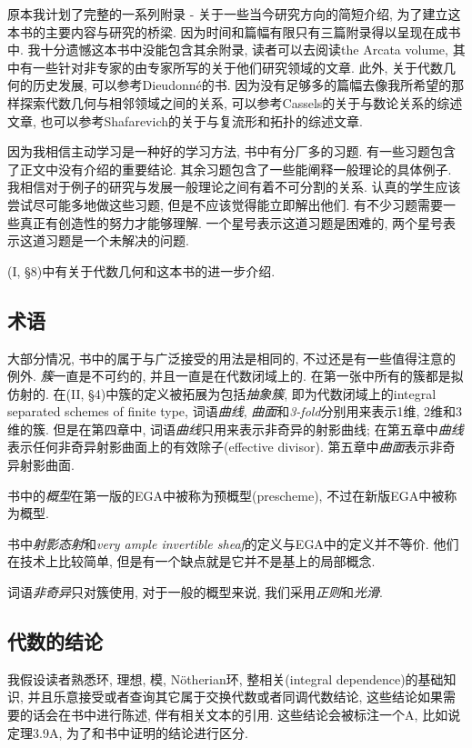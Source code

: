 原本我计划了完整的一系列附录 - 关于一些当今研究方向的简短介绍, 为了建立这本书的主要内容与研究的桥梁. 因为时间和篇幅有限只有三篇附录得以呈现在成书中. 我十分遗憾这本书中没能包含其余附录, 读者可以去阅读the Arcata volume, 其中有一些针对非专家的由专家所写的关于他们研究领域的文章. 此外, 关于代数几何的历史发展, 可以参考Dieudonn\'e的书. 因为没有足够多的篇幅去像我所希望的那样探索代数几何与相邻领域之间的关系, 可以参考Cassels的关于与数论关系的综述文章, 也可以参考Shafarevich的关于与复流形和拓扑的综述文章.

因为我相信主动学习是一种好的学习方法, 书中有分厂多的习题. 有一些习题包含了正文中没有介绍的重要结论. 其余习题包含了一些能阐释一般理论的具体例子. 我相信对于例子的研究与发展一般理论之间有着不可分割的关系. 认真的学生应该尝试尽可能多地做这些习题, 但是不应该觉得能立即解出他们. 有不少习题需要一些真正有创造性的努力才能够理解. 一个星号表示这道习题是困难的, 两个星号表示这道习题是一个未解决的问题.

(I, \S 8)中有关于代数几何和这本书的进一步介绍.

\subsection*{术语}

大部分情况, 书中的属于与广泛接受的用法是相同的, 不过还是有一些值得注意的例外. \emph{簇}一直是不可约的, 并且一直是在代数闭域上的. 在第一张中所有的簇都是拟仿射的. 在(II, \S 4)中簇的定义被拓展为包括\emph{抽象簇}, 即为代数闭域上的integral separated schemes of finite type, 词语\emph{曲线}, \emph{曲面}和\emph{3-fold}分别用来表示1维, 2维和3维的簇. 但是在第四章中, 词语\emph{曲线}只用来表示非奇异的射影曲线; 在第五章中\emph{曲线}表示任何非奇异射影曲面上的有效除子(effective divisor). 第五章中\emph{曲面}表示非奇异射影曲面.

书中的\emph{概型}在第一版的EGA中被称为预概型(prescheme), 不过在新版EGA中被称为概型.

书中\emph{射影态射}和\emph{very ample invertible sheaf}的定义与EGA中的定义并不等价. 他们在技术上比较简单, 但是有一个缺点就是它并不是基上的局部概念.

词语\emph{非奇异}只对簇使用, 对于一般的概型来说, 我们采用\emph{正则}和\emph{光滑}.

\subsection*{代数的结论}

我假设读者熟悉环, 理想, 模, N\"otherian环, 整相关(integral dependence)的基础知识, 并且乐意接受或者查询其它属于交换代数或者同调代数结论, 这些结论如果需要的话会在书中进行陈述, 伴有相关文本的引用. 这些结论会被标注一个A, 比如说定理3.9A, 为了和书中证明的结论进行区分.

